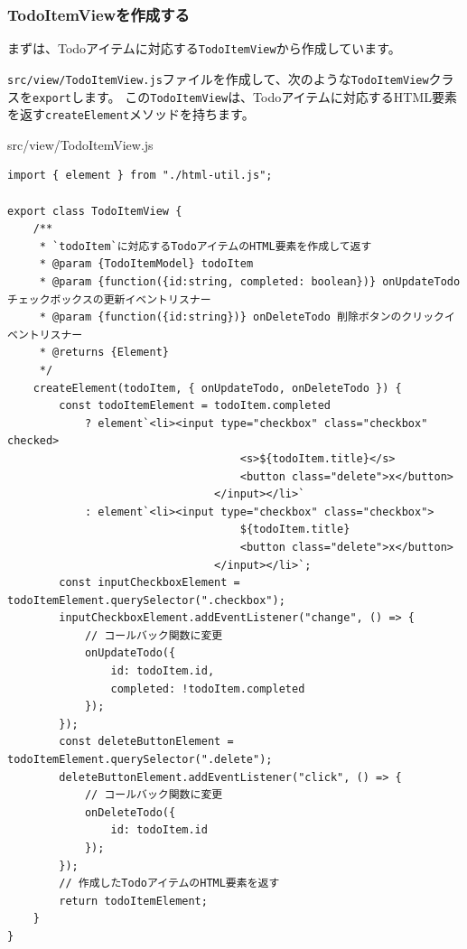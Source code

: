 \hypertarget{TodoItemView}{%
\subsubsection{TodoItemViewを作成する}\label{TodoItemView}}

まずは、Todoアイテムに対応する\texttt{TodoItemView}から作成しています。

\texttt{src/view/TodoItemView.js}ファイルを作成して、次のような\texttt{TodoItemView}クラスを\texttt{export}します。
この\texttt{TodoItemView}は、Todoアイテムに対応するHTML要素を返す\texttt{createElement}メソッドを持ちます。

\begin{listtitle}
src/view/TodoItemView.js
\end{listtitle}
\begin{lstlisting}
import { element } from "./html-util.js";

export class TodoItemView {
    /**
     * `todoItem`に対応するTodoアイテムのHTML要素を作成して返す
     * @param {TodoItemModel} todoItem
     * @param {function({id:string, completed: boolean})} onUpdateTodo チェックボックスの更新イベントリスナー
     * @param {function({id:string})} onDeleteTodo 削除ボタンのクリックイベントリスナー
     * @returns {Element}
     */
    createElement(todoItem, { onUpdateTodo, onDeleteTodo }) {
        const todoItemElement = todoItem.completed
            ? element`<li><input type="checkbox" class="checkbox" checked>
                                    <s>${todoItem.title}</s>
                                    <button class="delete">x</button>
                                </input></li>`
            : element`<li><input type="checkbox" class="checkbox">
                                    ${todoItem.title}
                                    <button class="delete">x</button>
                                </input></li>`;
        const inputCheckboxElement = todoItemElement.querySelector(".checkbox");
        inputCheckboxElement.addEventListener("change", () => {
            // コールバック関数に変更
            onUpdateTodo({
                id: todoItem.id,
                completed: !todoItem.completed
            });
        });
        const deleteButtonElement = todoItemElement.querySelector(".delete");
        deleteButtonElement.addEventListener("click", () => {
            // コールバック関数に変更
            onDeleteTodo({
                id: todoItem.id
            });
        });
        // 作成したTodoアイテムのHTML要素を返す
        return todoItemElement;
    }
}
\end{lstlisting}
\listend

